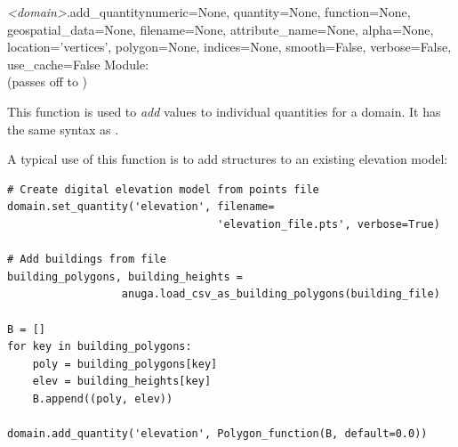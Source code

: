 \documentclass{manual}
\begin{document}
\begin{methoddesc}{\emph{<domain>}.add_quantity}{numeric=None,
                                                 quantity=None,
                                                 function=None,
                                                 geospatial_data=None,
                                                 filename=None,
                                                 attribute_name=None,
                                                 alpha=None,
                                                 location='vertices',
                                                 polygon=None,
                                                 indices=None,
                                                 smooth=False,
                                                 verbose=False,
                                                 use_cache=False}
Module:  \\
(passes off to )

\label{add quantity}
This function is used to \emph{add} values to individual quantities for a
domain. It has the same syntax as .

A typical use of this function is to add structures to an existing elevation model:

\begin{verbatim} 
# Create digital elevation model from points file
domain.set_quantity('elevation', filename=
                                 'elevation_file.pts', verbose=True)

# Add buildings from file
building_polygons, building_heights = 
                  anuga.load_csv_as_building_polygons(building_file)

B = []
for key in building_polygons:
    poly = building_polygons[key]
    elev = building_heights[key]
    B.append((poly, elev))

domain.add_quantity('elevation', Polygon_function(B, default=0.0))
\end{verbatim}
\end{methoddesc}
\end{document}
